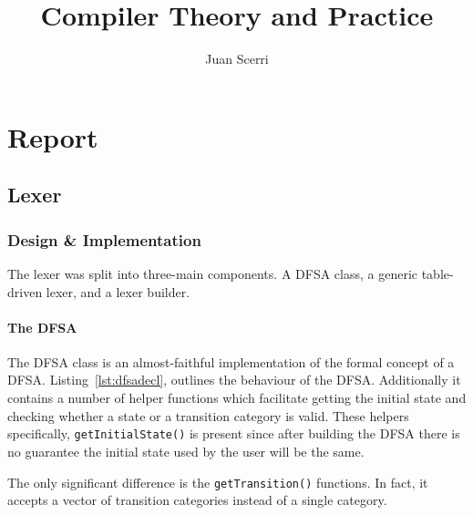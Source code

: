 \documentclass[article]{uom-coursework}
\title{Compiler Theory and Practice}
\author{Juan Scerri}
\newcommand{\listref}[1]{Listing~\ref{lst:#1}}
\begin{document}

\pagestyle{umpage}

\frontmatter

\maketitle %

\tableofcontents %

\clearpage

\lstlistoflistings

\clearpage

\mainmatter

\chapter*{Report}
\label{chap:report}

\section{Lexer}

\subsection{Design \& Implementation}

The lexer was split into three-main components. A
DFSA class, a generic table-driven lexer, and a
lexer builder.

\subsubsection{The DFSA}

The DFSA class is an almost-faithful
implementation of the formal concept of a DFSA.
\listref{dfsadecl}, outlines the behaviour of the
DFSA. Additionally it contains a number of helper
functions which facilitate getting the initial
state and checking whether a state or a transition
category is valid. These helpers specifically,
\texttt{getInitialState()} is present since after
building the DFSA there is no guarantee the
initial state used by the user will be the same.



The only significant difference is the
\texttt{getTransition()} functions. In fact, it
accepts a vector of transition categories instead
of a single category.
\end{document}
